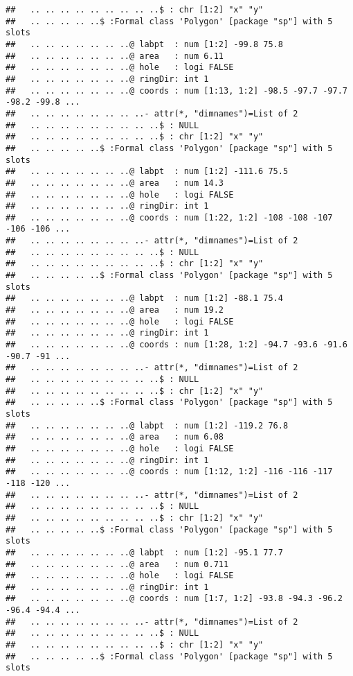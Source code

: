 \documentclass[]{article}
\begin{document}
\begin{verbatim}
##   .. .. .. .. .. .. .. .. ..$ : chr [1:2] "x" "y"
##   .. .. .. .. ..$ :Formal class 'Polygon' [package "sp"] with 5 slots
##   .. .. .. .. .. .. ..@ labpt  : num [1:2] -99.8 75.8
##   .. .. .. .. .. .. ..@ area   : num 6.11
##   .. .. .. .. .. .. ..@ hole   : logi FALSE
##   .. .. .. .. .. .. ..@ ringDir: int 1
##   .. .. .. .. .. .. ..@ coords : num [1:13, 1:2] -98.5 -97.7 -97.7 -98.2 -99.8 ...
##   .. .. .. .. .. .. .. ..- attr(*, "dimnames")=List of 2
##   .. .. .. .. .. .. .. .. ..$ : NULL
##   .. .. .. .. .. .. .. .. ..$ : chr [1:2] "x" "y"
##   .. .. .. .. ..$ :Formal class 'Polygon' [package "sp"] with 5 slots
##   .. .. .. .. .. .. ..@ labpt  : num [1:2] -111.6 75.5
##   .. .. .. .. .. .. ..@ area   : num 14.3
##   .. .. .. .. .. .. ..@ hole   : logi FALSE
##   .. .. .. .. .. .. ..@ ringDir: int 1
##   .. .. .. .. .. .. ..@ coords : num [1:22, 1:2] -108 -108 -107 -106 -106 ...
##   .. .. .. .. .. .. .. ..- attr(*, "dimnames")=List of 2
##   .. .. .. .. .. .. .. .. ..$ : NULL
##   .. .. .. .. .. .. .. .. ..$ : chr [1:2] "x" "y"
##   .. .. .. .. ..$ :Formal class 'Polygon' [package "sp"] with 5 slots
##   .. .. .. .. .. .. ..@ labpt  : num [1:2] -88.1 75.4
##   .. .. .. .. .. .. ..@ area   : num 19.2
##   .. .. .. .. .. .. ..@ hole   : logi FALSE
##   .. .. .. .. .. .. ..@ ringDir: int 1
##   .. .. .. .. .. .. ..@ coords : num [1:28, 1:2] -94.7 -93.6 -91.6 -90.7 -91 ...
##   .. .. .. .. .. .. .. ..- attr(*, "dimnames")=List of 2
##   .. .. .. .. .. .. .. .. ..$ : NULL
##   .. .. .. .. .. .. .. .. ..$ : chr [1:2] "x" "y"
##   .. .. .. .. ..$ :Formal class 'Polygon' [package "sp"] with 5 slots
##   .. .. .. .. .. .. ..@ labpt  : num [1:2] -119.2 76.8
##   .. .. .. .. .. .. ..@ area   : num 6.08
##   .. .. .. .. .. .. ..@ hole   : logi FALSE
##   .. .. .. .. .. .. ..@ ringDir: int 1
##   .. .. .. .. .. .. ..@ coords : num [1:12, 1:2] -116 -116 -117 -118 -120 ...
##   .. .. .. .. .. .. .. ..- attr(*, "dimnames")=List of 2
##   .. .. .. .. .. .. .. .. ..$ : NULL
##   .. .. .. .. .. .. .. .. ..$ : chr [1:2] "x" "y"
##   .. .. .. .. ..$ :Formal class 'Polygon' [package "sp"] with 5 slots
##   .. .. .. .. .. .. ..@ labpt  : num [1:2] -95.1 77.7
##   .. .. .. .. .. .. ..@ area   : num 0.711
##   .. .. .. .. .. .. ..@ hole   : logi FALSE
##   .. .. .. .. .. .. ..@ ringDir: int 1
##   .. .. .. .. .. .. ..@ coords : num [1:7, 1:2] -93.8 -94.3 -96.2 -96.4 -94.4 ...
##   .. .. .. .. .. .. .. ..- attr(*, "dimnames")=List of 2
##   .. .. .. .. .. .. .. .. ..$ : NULL
##   .. .. .. .. .. .. .. .. ..$ : chr [1:2] "x" "y"
##   .. .. .. .. ..$ :Formal class 'Polygon' [package "sp"] with 5 slots

\end{verbatim}
\end{document}
